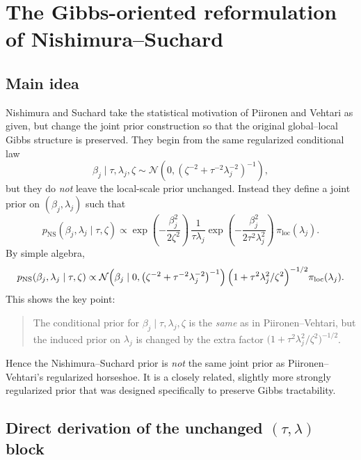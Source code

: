\documentclass[11pt]{article}
\newcommand{\Normal}{\mathcal{N}}
\newcommand{\NS}{\mathrm{NS}}
\newcommand{\Loc}{\pi_{\mathrm{loc}}}
\begin{document}
\section{The Gibbs-oriented reformulation of Nishimura--Suchard}

\subsection{Main idea}

Nishimura and Suchard take the statistical motivation of Piironen and Vehtari as given, but change the joint prior construction so that the original global--local Gibbs structure is preserved. They begin from the same regularized conditional law
\begin{equation}
\beta_j \mid \tau,\lambda_j,\zeta \sim \Normal\!\left(0,\left(\zeta^{-2}+\tau^{-2}\lambda_j^{-2}\right)^{-1}\right),
\label{eq:ns-same-cond}
\end{equation}
but they do \emph{not} leave the local-scale prior unchanged. Instead they define a joint prior on $(\beta_j,\lambda_j)$ such that
\begin{equation}
p_{\NS}(\beta_j,\lambda_j \mid \tau,\zeta)
\propto
\exp\!\left(-\frac{\beta_j^2}{2\zeta^2}\right)\,
\frac{1}{\tau\lambda_j}
\exp\!\left(-\frac{\beta_j^2}{2\tau^2\lambda_j^2}\right)\,
\Loc(\lambda_j).
\label{eq:ns-joint-basic}
\end{equation}
By simple algebra,
\begin{equation}
p_{\NS}(\beta_j,\lambda_j \mid \tau,\zeta)
\propto
\Normal\!\left(\beta_j \mid 0,\left(\zeta^{-2}+\tau^{-2}\lambda_j^{-2}\right)^{-1}\right)
\Bigl(1+\tau^2\lambda_j^2/\zeta^2\Bigr)^{-1/2}
\Loc(\lambda_j).
\label{eq:ns-joint-alt}
\end{equation}
This shows the key point:

\begin{quote}
The conditional prior for $\beta_j \mid \tau,\lambda_j,\zeta$ is the \emph{same} as in Piironen--Vehtari, but the induced prior on $\lambda_j$ is changed by the extra factor $\bigl(1+\tau^2\lambda_j^2/\zeta^2\bigr)^{-1/2}$.
\end{quote}

Hence the Nishimura--Suchard prior is \emph{not} the same joint prior as Piironen--Vehtari's regularized horseshoe. It is a closely related, slightly more strongly regularized prior that was designed specifically to preserve Gibbs tractability.

\subsection{Direct derivation of the unchanged $(\tau,\lambda)$ block}
\end{document}
